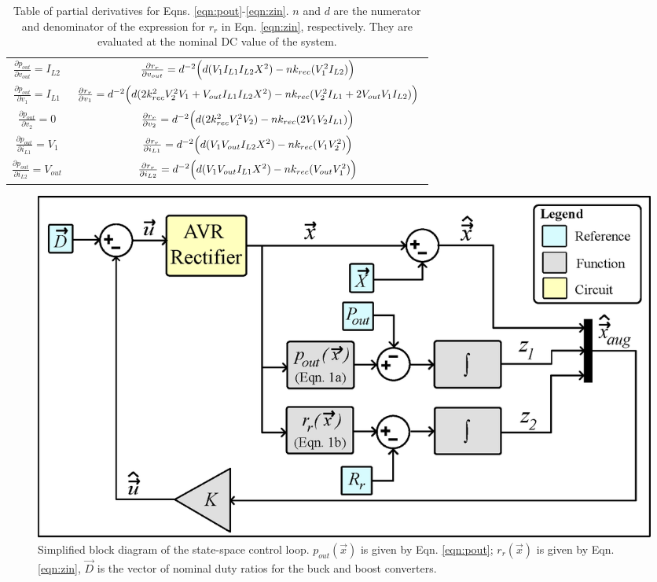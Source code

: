 \documentclass[conference, twocolumn, letterpaper]{IEEEtran}
\begin{document}
\renewcommand{\arraystretch}{2}
\begin{table}[t]
\vspace{-0.1cm}
\centering
\caption{Table of partial derivatives for Eqns. \ref{eqn:pout}-\ref{eqn:zin}. $n$ and $d$ are the numerator and denominator of the expression for $r_r$ in Eqn. \ref{eqn:zin}, respectively. They are evaluated at the nominal DC value of the system.}
\label{tab:partial_derivs}
\begin{tabular}{c|c}
\midrule
$\frac{\partial p_{out}}{\partial v_{out}} = I_{L2}$ & $\frac{\partial r_r}{\partial v_{out}} = d^{-2} \Bigl(d(V_1 I_{L1}I_{L2}X^2) - nk_{rec}(V_1^2 I_{L2})\Bigr)$ \\ 
$\frac{\partial p_{out}}{\partial v_{1}} = I_{L1}$ & $\frac{\partial r_r}{\partial v_{1}} = d^{-2} \Bigl(d(2k_{rec}^2V_2^2V_1 + V_{out}I_{L1}I_{L2}X^2) - nk_{rec}(V_2^2I_{L1}+2V_{out}V_1 I_{L2})\Bigr)$ \\ 
$\frac{\partial p_{out}}{\partial v_{2}} = 0$ & $\frac{\partial r_r}{\partial v_{2}} = d^{-2} \Bigl(d(2k_{rec}^2V_1^2V_2) - nk_{rec}(2V_1V_2I_{L1})\Bigr)$ \\
$\frac{\partial p_{out}}{\partial i_{L1}} = V_1$ & $\frac{\partial r_r}{\partial i_{L1}} = d^{-2} \Bigl(d(V_1V_{out}I_{L2}X^2) - nk_{rec}(V_1V_2^2)\Bigr)$ \\
$\frac{\partial p_{out}}{\partial i_{L2}} = V_{out}$ & $\frac{\partial r_r}{\partial i_{L2}} = d^{-2} \Bigl(d(V_1V_{out}I_{L1}X^2) - nk_{rec}(V_{out}V_1^2)\Bigr)$ \\
\midrule
\end{tabular}
\end{table}

\begin{figure}[!hb]
	\centering
  	\includegraphics[width=0.95\linewidth]{figures/block_diagram_eps.eps}
  	\caption{Simplified block diagram of the state-space control loop. $p_{out}(\vec{x})$ is given by Eqn. \ref{eqn:pout}; $r_r(\vec{x})$ is given by Eqn. \ref{eqn:zin}, $\vec{D}$ is the vector of nominal duty ratios for the buck and boost converters.}
  	\label{fig:block_diagram}
	\vspace{-0.5cm}
\end{figure}
\end{document}
